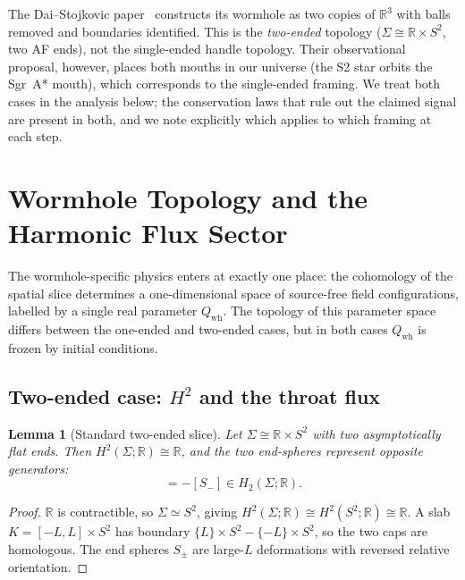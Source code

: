 \documentclass[aps,prd,onecolumn,nofootinbib,superscriptaddress]{revtex4-2}
\newtheorem{lemma}{Lemma}
\begin{document}
The Dai--Stojkovic paper~\cite{DaiStojkovic2019Observing} constructs its
wormhole as two copies of $\mathbb{R}^3$ with balls removed and boundaries
identified.  This is the \emph{two-ended} topology ($\Sigma\cong\mathbb{R}\times
S^2$, two AF ends), not the single-ended handle topology.  Their observational
proposal, however, places both mouths in our universe (the S2 star orbits the
Sgr~A* mouth), which corresponds to the single-ended framing.  We treat both
cases in the analysis below; the conservation laws that rule out the claimed
signal are present in both, and we note explicitly which applies to which
framing at each step.

\section{Wormhole Topology and the Harmonic Flux Sector}
\label{sec:topology}

The wormhole-specific physics enters at exactly one place: the cohomology of
the spatial slice determines a one-dimensional space of source-free field
configurations, labelled by a single real parameter $Q_{\mathrm{wh}}$.  The
topology of this parameter space differs between the one-ended and two-ended
cases, but in both cases $Q_{\mathrm{wh}}$ is frozen by initial conditions.

\subsection{Two-ended case: \texorpdfstring{$H^2$}{H2} and the throat flux}

\begin{lemma}[Standard two-ended slice]
\label{lem:standard-topology}
Let $\Sigma\cong\mathbb{R}\times S^2$ with two asymptotically flat ends.  Then
$H^2(\Sigma;\mathbb{R})\cong\mathbb{R}$, and the two end-spheres represent
opposite generators:
\begin{equation}
  [S_+] = -[S_-]\in H_2(\Sigma;\mathbb{R}).
\end{equation}
\end{lemma}

\begin{proof}
$\mathbb{R}$ is contractible, so $\Sigma\simeq S^2$, giving
$H^2(\Sigma;\mathbb{R})\cong H^2(S^2;\mathbb{R})\cong\mathbb{R}$.  A slab
$K=[-L,L]\times S^2$ has boundary $\{L\}\times S^2 - \{-L\}\times S^2$, so
the two caps are homologous.  The end spheres $S_\pm$ are large-$L$ deformations
with reversed relative orientation.
\end{proof}
\end{document}
